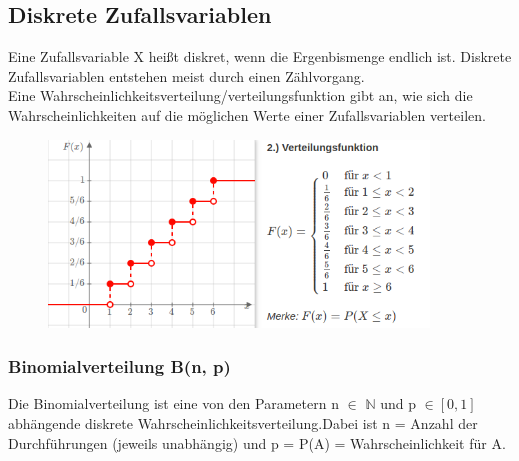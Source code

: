 \documentclass[a4paper,10pt]{scrartcl}
\begin{document}
\subsection{Diskrete Zufallsvariablen}
Eine Zufallsvariable X heißt diskret, wenn die Ergenbismenge endlich ist. Diskrete Zufallsvariablen entstehen meist durch einen Zählvorgang.\\
Eine Wahrscheinlichkeitsverteilung/verteilungsfunktion gibt an, wie sich die Wahrscheinlichkeiten auf die möglichen Werte einer Zufallsvariablen verteilen.
\begin{figure}[h] 
  \centering
    \includegraphics[width=0.9\textwidth]{Verteilungsfunktion.png}
  \label{fig:Bild1}
\end{figure}

\subsubsection{Binomialverteilung B(n, p)}
Die Binomialverteilung ist eine von den Parametern n $\in$ $\mathbb{N}$ und p $\in [0,1]$ abhängende diskrete Wahrscheinlichkeitsverteilung.Dabei ist n = Anzahl der Durchführungen (jeweils unabhängig) und p = P(A) = Wahrscheinlichkeit für A.
\end{document}
